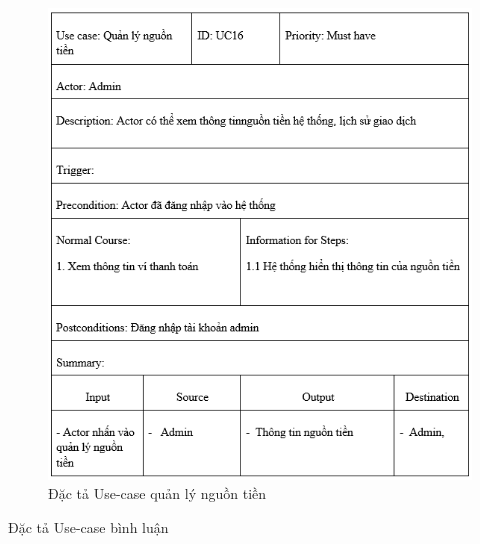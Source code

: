 \documentclass{article}
\begin{document}
{{{{{{{{{{{{{{{{	\begin{center}
		\begin{figure}[htp]
			\begin{center}
				\includegraphics[scale=.930]{anh26.png}
			\end{center}
			\caption{Đặc tả Use-case quản lý nguồn tiền}
			
		\end{figure}
	\end{center}
	
\newpage
{\large Đặc tả Use-case bình luận
	
}}}}}}}}}}}}}}}}}
\end{document}
